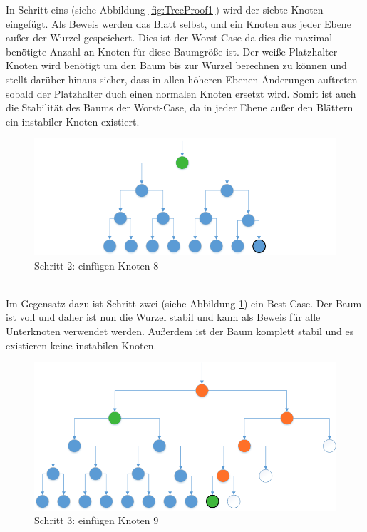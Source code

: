 In Schritt eins (siehe Abbildung \ref{fig:TreeProof1}) wird der siebte Knoten eingefügt. Als Beweis werden das Blatt selbst, und ein Knoten aus jeder Ebene außer der Wurzel gespeichert. Dies ist der Worst-Case da dies die maximal benötigte Anzahl an Knoten für diese Baumgröße ist. Der weiße Platzhalter-Knoten wird benötigt um den Baum bis zur Wurzel berechnen zu können und stellt darüber hinaus sicher, dass in allen höheren Ebenen Änderungen auftreten sobald der Platzhalter duch einen normalen Knoten ersetzt wird. Somit ist auch die Stabilität des Baums der Worst-Case, da in jeder Ebene außer den Blättern ein instabiler Knoten existiert.\\
\begin{figure}[!htb]
	\includegraphics[width=1\textwidth]{content/pictures/TreeProof2}
	\caption{Schritt 2: einfügen Knoten 8}
	\label{fig:TreeProof2}
\end{figure}
\\
Im Gegensatz dazu ist Schritt zwei (siehe Abbildung \ref{fig:TreeProof2}) ein Best-Case. Der Baum ist voll und daher ist nun die Wurzel stabil und kann als Beweis für alle Unterknoten verwendet werden. Außerdem ist der Baum komplett stabil und es existieren keine instabilen Knoten.\\
\begin{figure}[!htb]
	\includegraphics[width=1\textwidth]{content/pictures/TreeProof3}
	\caption{Schritt 3: einfügen Knoten 9}
	\label{fig:TreeProof3}
\end{figure}
